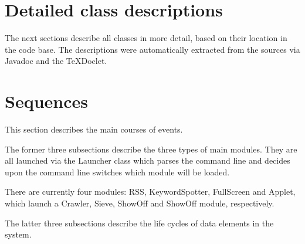 \section{Detailed class descriptions}

The next sections describe all classes in more detail, based on their location
in the code base. The descriptions were automatically extracted from the
sources via Javadoc and the \TeX{}Doclet.




\section{Sequences}

This section describes the main courses of events.

The former three subsections describe the three types of main modules. They are
all launched via the Launcher class which parses the command line and decides
upon the command line switches which module will be loaded.

There are currently four modules: RSS, KeywordSpotter, FullScreen and Applet,
which launch a Crawler, Sieve, ShowOff and ShowOff module, respectively.

The latter three subsections describe the life cycles of data elements in the
system.













